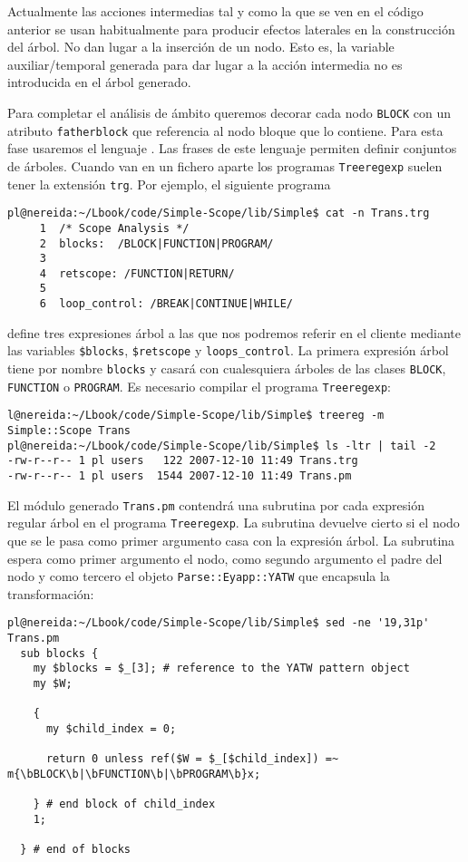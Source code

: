 Actualmente las acciones intermedias tal y como la que se ven en el código anterior
se usan habitualmente para producir efectos laterales en la construcción
del árbol. No dan lugar a la inserción de un nodo. Esto es, la variable 
auxiliar/temporal generada para dar lugar a la acción intermedia
no es introducida en el árbol generado.


Para completar el análisis de ámbito queremos decorar cada nodo \verb|BLOCK|
con un atributo \verb|fatherblock| que referencia al nodo bloque 
que lo contiene. Para esta fase usaremos el lenguaje . 
Las frases de este lenguaje permiten definir conjuntos de árboles. Cuando van en un fichero aparte los programas 
\verb|Treeregexp| suelen tener la extensión \verb|trg|. Por ejemplo,
el siguiente programa 
\begin{verbatim}
pl@nereida:~/Lbook/code/Simple-Scope/lib/Simple$ cat -n Trans.trg
     1  /* Scope Analysis */
     2  blocks:  /BLOCK|FUNCTION|PROGRAM/
     3
     4  retscope: /FUNCTION|RETURN/
     5
     6  loop_control: /BREAK|CONTINUE|WHILE/
\end{verbatim}
define tres expresiones árbol a las que nos podremos referir en el
cliente mediante las variables \verb|$blocks|, \verb|$retscope| y 
\verb|loops_control|. La primera expresión árbol tiene por nombre \verb|blocks|
y casará con cualesquiera árboles de las clases \verb|BLOCK|, \verb|FUNCTION| o \verb|PROGRAM|.
Es necesario compilar el programa \verb|Treeregexp|:
\begin{verbatim}
l@nereida:~/Lbook/code/Simple-Scope/lib/Simple$ treereg -m Simple::Scope Trans
pl@nereida:~/Lbook/code/Simple-Scope/lib/Simple$ ls -ltr | tail -2
-rw-r--r-- 1 pl users   122 2007-12-10 11:49 Trans.trg
-rw-r--r-- 1 pl users  1544 2007-12-10 11:49 Trans.pm
\end{verbatim}
El módulo generado \verb|Trans.pm| contendrá una subrutina por cada expresión
regular árbol en el programa \verb|Treeregexp|. 
La subrutina devuelve cierto si el nodo que se le pasa como primer argumento 
casa con la expresión árbol. La subrutina espera como primer argumento el nodo, como
segundo argumento el padre del nodo y como tercero el objeto \verb|Parse::Eyapp::YATW| que encapsula 
la transformación:
\begin{verbatim}
pl@nereida:~/Lbook/code/Simple-Scope/lib/Simple$ sed -ne '19,31p' Trans.pm
  sub blocks {
    my $blocks = $_[3]; # reference to the YATW pattern object
    my $W;

    {
      my $child_index = 0;

      return 0 unless ref($W = $_[$child_index]) =~ m{\bBLOCK\b|\bFUNCTION\b|\bPROGRAM\b}x;

    } # end block of child_index
    1;

  } # end of blocks
\end{verbatim}
